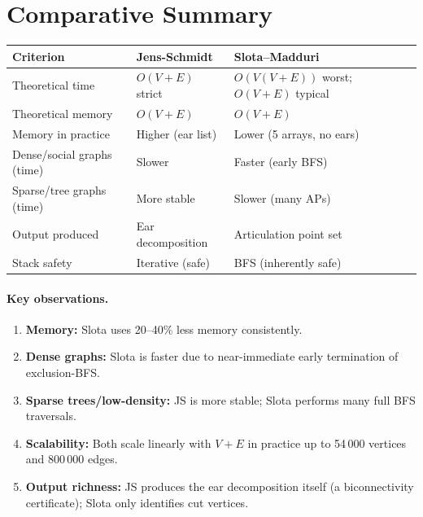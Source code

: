 \documentclass[12pt,a4paper]{article}
\begin{document}
\section{Comparative Summary}

\begin{center}
\begin{tabular}{|l|l|l|}
\hline
\textbf{Criterion} & \textbf{Jens-Schmidt} & \textbf{Slota--Madduri} \\ \hline
Theoretical time   & $O(V+E)$ strict       & $O(V(V+E))$ worst; $O(V+E)$ typical \\ \hline
Theoretical memory & $O(V+E)$              & $O(V+E)$ \\ \hline
Memory in practice & Higher (ear list)     & Lower (5 arrays, no ears) \\ \hline
Dense/social graphs (time) & Slower        & Faster (early BFS) \\ \hline
Sparse/tree graphs (time)  & More stable   & Slower (many APs) \\ \hline
Output produced    & Ear decomposition     & Articulation point set \\ \hline
Stack safety       & Iterative (safe)      & BFS (inherently safe) \\ \hline
\end{tabular}
\end{center}

\paragraph{Key observations.}
\begin{enumerate}
    \item \textbf{Memory:} Slota uses 20--40\% less memory consistently.
    \item \textbf{Dense graphs:} Slota is faster due to near-immediate
          early termination of exclusion-BFS.
    \item \textbf{Sparse trees/low-density:} JS is more stable; Slota
          performs many full BFS traversals.
    \item \textbf{Scalability:} Both scale linearly with $V+E$ in practice
          up to 54\,000 vertices and 800\,000 edges.
    \item \textbf{Output richness:} JS produces the ear decomposition itself
          (a biconnectivity certificate); Slota only identifies cut vertices.
\end{enumerate}
\end{document}
